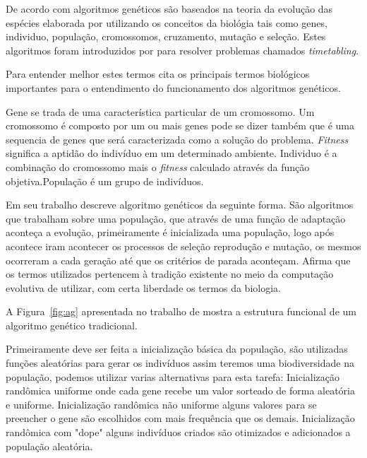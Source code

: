 \documentclass{abntpuc}
\begin{document}
%
%
%


De acordo com \cite{goldberg1989genetic} algoritmos genéticos são baseados na teoria da evolução das espécies elaborada por \cite{darwin1968origin} utilizando os conceitos da biológia tais como genes, individuo, população, cromossomos, cruzamento, mutação e seleção. Estes algoritmos foram introduzidos por \cite{holland1975adaptation} para resolver problemas chamados \textit{timetabling}.

Para entender melhor estes termos \cite{mitchell1998introduction} cita os principais termos biológicos importantes para o entendimento do funcionamento dos algoritmos genéticos.\par
Gene se trada de uma característica particular de um cromossomo. Um cromossomo é composto por um ou mais genes pode se dizer também que é uma sequencia de genes que será caracterizada como a solução do problema. \textit{Fitness} significa a aptidão do indivíduo em um determinado ambiente. Individuo é a combinação do cromossomo mais o \textit{fitness} calculado através da função objetiva.População é um grupo de indivíduos.\par

Em seu trabalho \cite{lucas2000algoritmos} descreve algoritmo genéticos da seguinte forma. São algoritmos que trabalham sobre uma população, que através de uma função de adaptação aconteça a evolução, primeiramente é inicializada uma população, logo após acontece iram acontecer os processos de seleção reprodução e mutação, os mesmos ocorreram a cada geração até que os critérios de parada aconteçam. Afirma que os termos utilizados pertencem à tradição existente no meio da computação evolutiva de utilizar, com certa liberdade os termos da biologia.

A Figura~\ref{fig:ag} apresentada no trabalho de \cite{lucas2000algoritmos} mostra a estrutura funcional de um algoritmo genético tradicional.\par
Primeiramente deve ser feita a inicialização básica da população, são utilizadas funções aleatórias para gerar os indivíduos assim teremos uma biodiversidade na população, podemos utilizar varias alternativas para esta tarefa: Inicialização randômica uniforme onde cada gene recebe um valor sorteado de forma aleatória e uniforme. Inicialização randômica não uniforme alguns valores para se preencher o gene são escolhidos com mais frequência que os demais. Inicialização randômica com "dope" alguns indivíduos criados são otimizados e adicionados a população aleatória.
\end{document}
